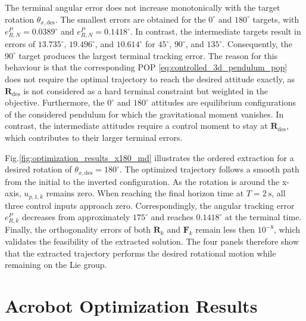 The terminal angular error does not increase monotonically with the target rotation
\(\theta_{x,\mathrm{des}}\). The smallest errors are obtained for the \(0^\circ\) and 
\(180^\circ\) targets, with \(e_{R,N}^{P}=0.0389^\circ\) and 
\(e_{R,N}^{P}=0.1418^\circ\). In contrast, the intermediate targets 
result in errors of \(13.735^\circ\), \(19.496^\circ\), and \(10.614^\circ\) for 
\(45^\circ\), \(90^\circ\), and \(135^\circ\). Consequently, the \(90^\circ\) target 
produces the largest terminal tracking error. The reason for this behaviour is that
the corresponding POP \eqref{eq:controlled_3d_pendulum_pop} does not require the 
optimal trajectory to reach the desired attitude exactly, as $\bm{R}_{\mathrm{des}}$ is not considered
as a hard terminal constraint but weighted in the objective. Furthermore, the \(0^\circ\) and 
\(180^\circ\) attitudes are equilibrium configurations of the considered pendulum for which 
the gravitational moment vanishes. In contrast, the intermediate attitudes require a 
control moment to stay at $\bm{R}_{\mathrm{des}}$, which contributes to their larger terminal errors. 

Fig.\ref{fig:optimization_results_x180_md} illustrates the ordered extraction 
for a desired rotation of \(\theta_{x,\mathrm{des}}=180^\circ\). The 
optimized trajectory follows a smooth path
from the initial to the inverted configuration.
As the rotation is around the x-axis, \(u_{p,1,k}\) 
remains zero. When reaching the final horizon time at $T=\SI{2}{\second}$, all three control
inputs approach zero. Correspondingly, the angular tracking error \(e_{R,k}^{P}\)
decreases from approximately \(175^\circ\) and reaches \(0.1418^\circ\) at the terminal time.
Finally, the orthogonality errors of both \(\bm R_k\) and \(\bm F_k\) remain less then
\(10^{-8}\), which validates the feasibility of the extracted solution. 
The four panels therefore show that the extracted trajectory performs the 
desired rotational motion while remaining on the Lie group.

\section{Acrobot Optimization Results}
\label{sec:acrobot_optimization_results}

